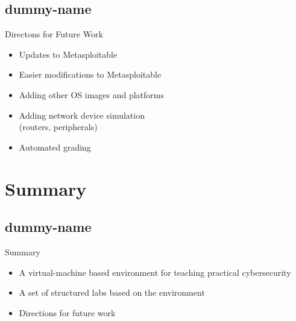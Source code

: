 \documentclass{beamer}
\begin{document}
	\subsection{dummy-name}
				
	\begin{frame}{Directons for Future Work}
		\begin{itemize}	
			\item Updates to Metasploitable
			\item Easier modifications to Metasploitable
			\item Adding other OS images and platforms
			\item Adding network device simulation\\(routers, peripherals)
			\item Automated grading
		\end{itemize}
	\end{frame}

	\section{Summary}
	\subsection{dummy-name}	
	\begin{frame}{Summary}
		\begin{itemize}
			\item	A virtual-machine based environment for teaching practical cybersecurity
			\pause			
			\item A set of structured labs based on the environment
			\pause
			\item Directions for future work
		\end{itemize}
	\end{frame}
	
\end{document}
